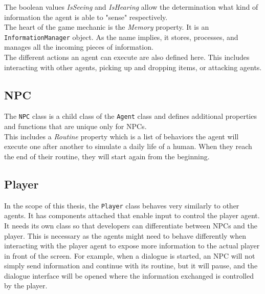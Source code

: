 The boolean values \textit{IsSeeing} and \textit{IsHearing} allow the determination what kind of information the agent is able to "sense" respectively.\\
The heart of the game mechanic is the \textit{Memory} property. It is an \verb|InformationManager| object. As the name implies, it stores, processes, and manages all the incoming pieces of information.\\
The different actions an agent can execute are also defined here. This includes interacting with other agents, picking up and dropping items, or attacking agents.
\subsection{NPC}
The \verb|NPC| class is a child class of the \verb|Agent| class and defines additional properties and functions that are unique only for NPCs.\\
This includes a \textit{Routine} property which is a list of behaviors the agent will execute one after another to simulate a daily life of a human. When they reach the end of their routine, they will start again from the beginning.
\subsection{Player}
In the scope of this thesis, the \verb|Player| class behaves very similarly to other agents. It has components attached that enable input to control the player agent. It needs its own class so that developers can differentiate between NPCs and the player. This is necessary as the agents might need to behave differently when interacting with the player agent to expose more information to the actual player in front of the screen. For example, when a dialogue is started, an NPC will not simply send information and continue with its routine, but it will pause, and the dialogue interface will be opened where the information exchanged is controlled by the player.
